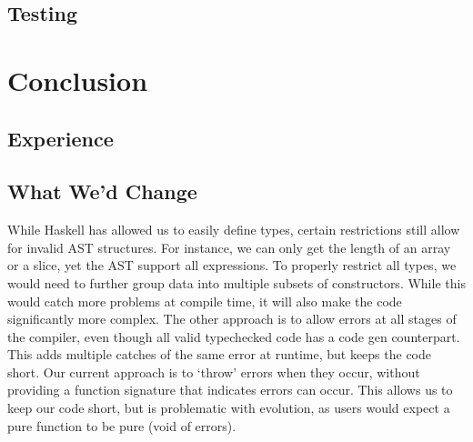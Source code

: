 \documentclass[11pt]{article}
\begin{document}
\subsection{Testing} %
\section{Conclusion}
\subsection{Experience} %
\subsection{What We'd Change}

While Haskell has allowed us to easily define types, certain
restrictions still allow for invalid AST structures.  For instance, we
can only get the length of an array or a slice, yet the AST support
all expressions.  To properly restrict all types, we would need to
further group data into multiple subsets of constructors\cite{so:pattern/matching/subset}.  While this
would catch more problems at compile time, it will also make the code
significantly more complex.  The other approach is to allow errors at
all stages of the compiler, even though all valid typechecked code has
a code gen counterpart.  This adds multiple catches of the same error
at runtime, but keeps the code short.  Our current approach is to
`throw' errors when they occur, without providing a function signature
that indicates errors can occur.  This allows us to keep our code
short, but is problematic with evolution, as users would expect a pure
function to be pure (void of errors).
\end{document}
